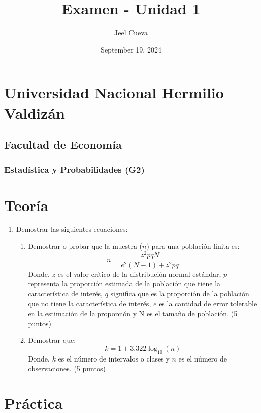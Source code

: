 \documentclass{article}
\title{Examen - Unidad 1}
\author{Jeel Cueva}
\date{September 19, 2024}
\begin{document}
\maketitle

\section*{Universidad Nacional Hermilio Valdizán}
\subsection*{Facultad de Economía}

\subsubsection*{Estadística y Probabilidades (G2)}

\section*{Teoría}

\begin{enumerate}
    \item Demostrar las siguientes ecuaciones:
    \begin{enumerate}
        \item Demostrar o probar que la muestra ($n$) para una población finita es:
\[
        n = \frac{z^2pqN}{e^2(N-1)+z^2pq}
\]
        Donde, $z$ es el valor crítico de la distribución normal estándar, $p$ representa la proporción estimada de la población que tiene la característica de interés, $q$ significa que es la proporción de la población que no tiene la característica de interés, $e$ es la cantidad de error tolerable en la estimación de la proporción y N es el tamaño de población. (5 puntos)
        
        \item Demostrar que:
\[
        k = 1 + 3.322 \log_{10}(n)
\]
        Donde, $k$ es el número de intervalos o clases y $n$ es el número de observaciones. (5 puntos)
    \end{enumerate}
\end{enumerate}

\section*{Práctica}
\end{document}
